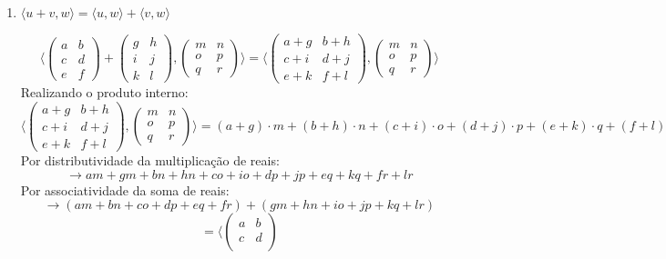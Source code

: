 \documentclass[12pt, twoside, a4]{article} %
\begin{document}
\begin{enumerate}
    \item $ \langle u + v, w \rangle =  \langle u, w \rangle + \langle v, w \rangle $
    
    \[ \langle \begin{pmatrix} 
        a & b \\
        c & d \\
        e & f
       \end{pmatrix} + 
       \begin{pmatrix} 
        g & h \\
        i & j \\
        k & l
        \end{pmatrix},
        \begin{pmatrix} 
        m & n \\
        o & p \\
        q & r
        \end{pmatrix} \rangle = 
        \langle \begin{pmatrix} 
        a + g & b + h \\
        c + i & d + j \\
        e + k & f + l 
        \end{pmatrix} ,\begin{pmatrix} 
        m & n \\
        o & p \\
        q & r
        \end{pmatrix} \rangle \]
    Realizando o produto interno:
        \[\langle \begin{pmatrix} 
        a + g & b + h \\
        c + i & d + j \\
        e + k & f + l 
        \end{pmatrix} ,\begin{pmatrix} 
        m & n \\
        o & p \\
        q & r
        \end{pmatrix} \rangle 
        = (a + g) \cdot m + (b + h) \cdot n + (c + i) \cdot o + (d + j) \cdot p + (e + k) \cdot q + (f + l) \cdot r \]
    Por distributividade da multiplicação de reais:     
    \[\to am + gm + bn + hn + co + io + dp + jp + eq + kq + fr + lr \]
    Por associatividade da soma de reais:
    \[\to ( am + bn + co + dp + eq + fr) + (gm +  hn + io + jp + kq + lr)\]
    \[=
    \langle \begin{pmatrix} 
    a & b \\
    c & d \\

\end{pmatrix}\]
\end{enumerate}
\end{document}
